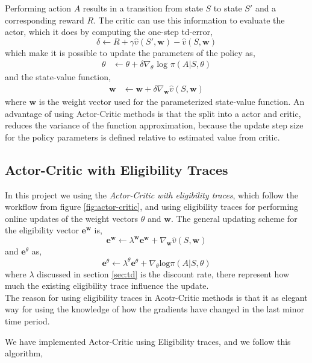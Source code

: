 \documentclass[11pt]{article}
\begin{document}
Performing action $A$ results in a transition from state $S$ to state $S'$ and a corresponding reward $R$. The critic can use this information to evaluate the actor, which it does by computing the one-step td-error,
\begin{equation}
    \delta \leftarrow R + \gamma \hat{v} (S', \mathbf{w}) - \hat{v}(S, \mathbf{w})
\end{equation}
which make it is possible to update the parameters of the policy as,
\begin{equation}
\begin{split}
    \theta &\leftarrow \theta + \delta \nabla_{\theta} \text{ log } \pi(A | S, \theta)
\end{split}
\end{equation}
and the state-value function,
\begin{equation}
\begin{split}
    \mathbf{w} &\leftarrow \mathbf{w} + \delta \nabla_{\mathbf{w}} \hat{v}(S, \mathbf{w})
\end{split}
\end{equation}
where $\mathbf{w}$ is the weight vector used for the parameterized state-value function.
An advantage of using Actor-Critic methods is that the split into a actor and critic, reduces the variance of the function approximation, because the update step size for the policy parameters is defined relative to estimated value from critic.\cite{actCrit}


\subsection{Actor-Critic with Eligibility Traces}

In this project we using the \textit{Actor-Critic with eligibility traces}, which follow the workflow from figure \ref{fig:actor-critic}, and using eligibility traces for performing online updates of the weight vectors $\theta$ and $\mathbf{w}$. The general updating scheme for the eligibility vector $\mathbf{e}^{\mathbf{w}}$ is,
\begin{equation}
    \mathbf{e}^{\mathbf{w}} \leftarrow \lambda^{\mathbf{w}} \mathbf{e}^{\mathbf{w}} + \nabla_{\mathbf{w}} \hat{v}(S, \mathbf{w})
\end{equation}
and $\mathbf{e}^{\theta}$ as,
\begin{equation}
    \mathbf{e}^{\theta} \leftarrow \lambda^{\theta} \mathbf{e}^{\theta} + \nabla_{\theta} \text{log} \pi (A | S, \theta)
\end{equation}
where $\lambda$ discussed in section \ref{sec:td} is the discount rate, there represent how much the existing eligibility trace influence the update.
\\
The reason for using eligibility traces in Acotr-Critic methods is that it as elegant way for using the knowledge of how the gradients have changed in the last minor time period.

We have implemented Actor-Critic using Eligibility traces, and we follow this algorithm,\cite{RLbook}









%
%
\end{document}
